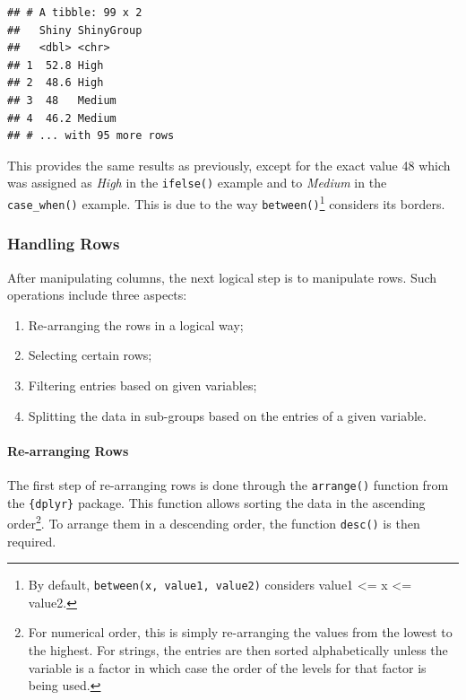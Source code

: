 \documentclass[
]{krantz}
\providecommand{\tightlist}{%
  \setlength{\itemsep}{0pt}\setlength{\parskip}{0pt}}
\begin{document}
\begin{verbatim}
## # A tibble: 99 x 2
##   Shiny ShinyGroup
##   <dbl> <chr>     
## 1  52.8 High      
## 2  48.6 High      
## 3  48   Medium    
## 4  46.2 Medium    
## # ... with 95 more rows
\end{verbatim}

This provides the same results as previously, except for the exact value 48 which was assigned as \emph{High} in the \texttt{ifelse()} example and to \emph{Medium} in the \texttt{case\_when()} example. This is due to the way \texttt{between()}\footnote{By default, \texttt{between(x,\ value1,\ value2)} considers value1 \textless= x \textless= value2.} considers its borders.

\hypertarget{handling-rows}{%
\subsubsection{Handling Rows}\label{handling-rows}}

After manipulating columns, the next logical step is to manipulate rows. Such operations include three aspects:

\begin{enumerate}
\def\labelenumi{\arabic{enumi}.}
\tightlist
\item
  Re-arranging the rows in a logical way;
\item
  Selecting certain rows;
\item
  Filtering entries based on given variables;
\item
  Splitting the data in sub-groups based on the entries of a given variable.
\end{enumerate}

\hypertarget{re-arranging-rows}{%
\paragraph*{Re-arranging Rows}\label{re-arranging-rows}}

The first step of re-arranging rows is done through the \texttt{arrange()} function from the \texttt{\{dplyr\}} package. This function allows sorting the data in the ascending order\footnote{For numerical order, this is simply re-arranging the values from the lowest to the highest. For strings, the entries are then sorted alphabetically unless the variable is a factor in which case the order of the levels for that factor is being used.}. To arrange them in a descending order, the function \texttt{desc()} is then required.
\end{document}
